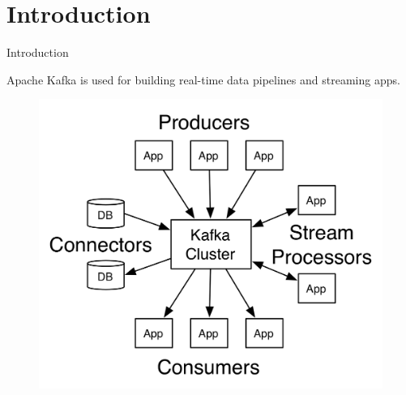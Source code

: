 \section{Introduction}
\begin{frame}[plain,t]{Introduction} %
	  \vspace{2ex}

   Apache Kafka is used for building real-time data pipelines and streaming apps. 
    
 \vspace{-2ex}
\begin{figure}
    \centering
    \includegraphics[width=0.7\linewidth]{image/0101}
    \label{fig:0101}
\end{figure}
\end{frame}



